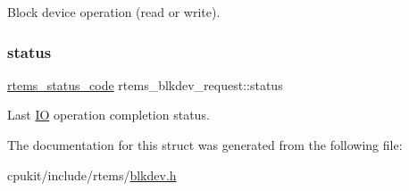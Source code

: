 Block device operation (read or write). \mbox{\label{structrtems__blkdev__request_a7200280756d1db24e67d2ad0437a538b}} 
\subsubsection{\texorpdfstring{status}{status}}
{\footnotesize\ttfamily \mbox{\hyperlink{group__ClassicStatus_ga545d41846817eaba6143d52ee4d9e9fe}{rtems\+\_\+status\+\_\+code}} rtems\+\_\+blkdev\+\_\+request\+::status}

Last \mbox{\hyperlink{structIO}{IO}} operation completion status. 

The documentation for this struct was generated from the following file\+:\begin{DoxyCompactItemize}
\item 
cpukit/include/rtems/\mbox{\hyperlink{blkdev_8h}{blkdev.\+h}}\end{DoxyCompactItemize}

